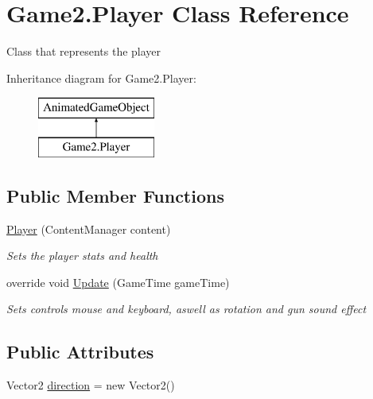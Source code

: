\hypertarget{class_game2_1_1_player}{}\section{Game2.\+Player Class Reference}
\label{class_game2_1_1_player}


Class that represents the player  


Inheritance diagram for Game2.\+Player\+:\begin{figure}[H]
\begin{center}
\leavevmode
\includegraphics[height=2.000000cm]{class_game2_1_1_player}
\end{center}
\end{figure}
\subsection*{Public Member Functions}
\begin{DoxyCompactItemize}
\item 
\mbox{\hyperlink{class_game2_1_1_player_aba2289750066d1fbf0cf9ba5aabf7027}{Player}} (Content\+Manager content)
\begin{DoxyCompactList}\small\item\em Sets the player stats and health \end{DoxyCompactList}\item 
override void \mbox{\hyperlink{class_game2_1_1_player_a14ef301313a531bd8379300ef0588378}{Update}} (Game\+Time game\+Time)
\begin{DoxyCompactList}\small\item\em Sets controls mouse and keyboard, aswell as rotation and gun sound effect \end{DoxyCompactList}\end{DoxyCompactItemize}
\subsection*{Public Attributes}
\begin{DoxyCompactItemize}
\item 
Vector2 \mbox{\hyperlink{class_game2_1_1_player_ae8c457659c53b82a059739f18c52de9c}{direction}} = new Vector2()
\end{DoxyCompactItemize}
